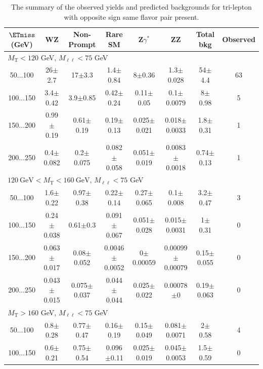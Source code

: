 \begin{landscape}
\begin{table}
\begin{center}
\caption{\label{tab:OSSF1tau0} The summary of the observed yields and predicted backgrounds for tri-lepton 
with opposite sign same flavor pair present. }
\begin{tabular}{| c | c c c c c c c | }\hline\hline
$\ETmiss$ (GeV) & WZ & Non-Prompt & Rare SM & Z$\gamma^*$ & ZZ & Total bkg & Observed\\\hline\hline
\multicolumn{8}{l}{$M_{\text{T}} < 120$ GeV, $M_{\ell\ell} < 75$ GeV}\\\hline\hline
50$\dots$100&26$\pm$2.7&17$\pm$3.3&1.4$\pm$0.84&8$\pm$0.36&1.3$\pm$0.028&54$\pm$4.4&63\\
100$\dots$150&3.4$\pm$0.42&3.9$\pm$0.85&0.42$\pm$0.24&0.11$\pm$0.05&0.1$\pm$0.0079&8$\pm$0.98&5\\
150$\dots$200&0.99$\pm$0.19&0.61$\pm$0.19&0.19$\pm$0.13&0.025$\pm$0.021&0.018$\pm$0.0033&1.8$\pm$0.31&1\\
200$\dots$250&0.4$\pm$0.082&0.2$\pm$0.075&0.082$\pm$0.058&0.051$\pm$0.019&0.0083$\pm$0.0018&0.74$\pm$0.13&1\\
\hline\hline
\multicolumn{8}{l}{$120~\mathrm{GeV} < M_{\text{T}} < 160~\mathrm{GeV}$, $M_{\ell\ell} < 75$ GeV}\\\hline\hline
50$\dots$100&1.6$\pm$0.22&0.97$\pm$0.38&0.22$\pm$0.14&0.27$\pm$0.065&0.1$\pm$0.008&3.2$\pm$0.47&3\\
100$\dots$150&0.24$\pm$0.038&0.61$\pm$0.3&0.091$\pm$0.067&0.051$\pm$0.028&0.015$\pm$0.0031&1$\pm$0.31&0\\
150$\dots$200&0.063$\pm$0.017&0.08$\pm$0.052&0.0046$\pm$0.0052&0$\pm$0.00059&0.00099$\pm$0.00079&0.15$\pm$0.055&0\\
200$\dots$250&0.043$\pm$0.015&0.075$\pm$0.037&0.044$\pm$0.044&0.025$\pm$0.022&0.00078$\pm$0&0.19$\pm$0.063&0\\
\hline\hline
\multicolumn{8}{l}{$M_{\text{T}} > 160$ GeV, $M_{\ell\ell} < 75$ GeV}\\\hline\hline
50$\dots$100&0.8$\pm$0.28&0.77$\pm$0.47&0.16$\pm$0.19&0.15$\pm$0.049&0.081$\pm$0.0071&2$\pm$0.58&4\\
100$\dots$150&0.6$\pm$0.21&0.75$\pm$0.54&0.096$\pm$0.11&0.025$\pm$0.019&0.045$\pm$0.0053&1.5$\pm$0.59&0\\

\end{tabular}
\end{center}
\end{table}
\end{landscape}
